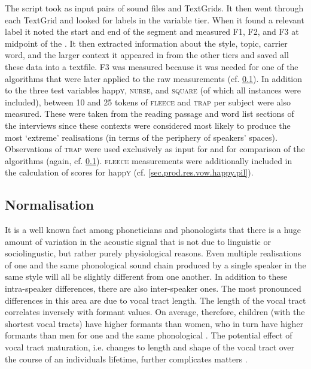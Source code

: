 The script took as input pairs of sound files and TextGrids.
It then went through each TextGrid and looked for  labels in the variable tier.
When it found a relevant label it noted the start and end of the segment and measured F1, F2, and F3 at midpoint of the .
It then extracted information about the style, topic, carrier word, and the larger context it appeared in from the other tiers and saved all these data into a textfile.
F3 was measured because it was needed for one of the  algorithms that were later applied to the raw measurements (cf. \ref{sec.prod_method.norm}).
In addition to the three  test variables happ\textsc{y}, \textsc{nurse}, and \textsc{square} (of which all instances were included), between 10 and 25 tokens of \textsc{fleece} and \textsc{trap} per subject were also measured.
These were taken from the reading passage and word list sections of the interviews since these contexts were considered most likely to produce the most `extreme' realisations (in terms of the periphery of speakers'  spaces).
Observations of \textsc{trap} were used exclusively as input for  and for comparison of the algorithms (again, cf. \ref{sec.prod_method.norm}).
\textsc{fleece} measurements were additionally included in the calculation of  scores for happ\textsc{y} (cf. \ref{sec.prod.res.vow.happy.pil}).

\subsection{Normalisation}\label{sec.prod_method.norm}

It is a well known fact among phoneticians and phonologists that there is a huge amount of variation in the acoustic signal that is not due to linguistic or sociolingustic, but rather purely physiological reasons.
Even multiple realisations of one and the same phonological sound chain produced by a single speaker in the same style will all be slightly different from one another.
In addition to these intra-speaker differences, there are also inter-speaker ones.
The most pronounced differences in this area are due to vocal tract length.
The length of the vocal tract correlates inversely with  formant values.
On average, therefore, children (with the shortest vocal tracts) have higher formants than women, who in turn have higher formants than men for one and the same phonological .
The potential effect of vocal tract maturation, i.e. changes to length and shape of the vocal tract over the course of an individuals lifetime, further complicates matters \parencite[cf.][440--441]{harrington2006}.

